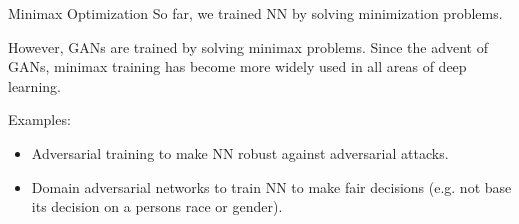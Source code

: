 \begin{frame}[allowframebreaks]

\begin{myconceptblock}{12.3}{Minimax Optimization}
    So far, we trained NN by solving minimization problems.

    However, GANs are trained by solving minimax problems. Since the advent of GANs, minimax training has become more widely used in all areas of deep learning.

    Examples:

    \begin{itemize}
        \item Adversarial training to make NN robust against adversarial attacks.
        \item Domain adversarial networks to train NN to make fair decisions (e.g. not base its decision on a persons race or gender).
    \end{itemize}
\end{myconceptblock}

\end{frame}


